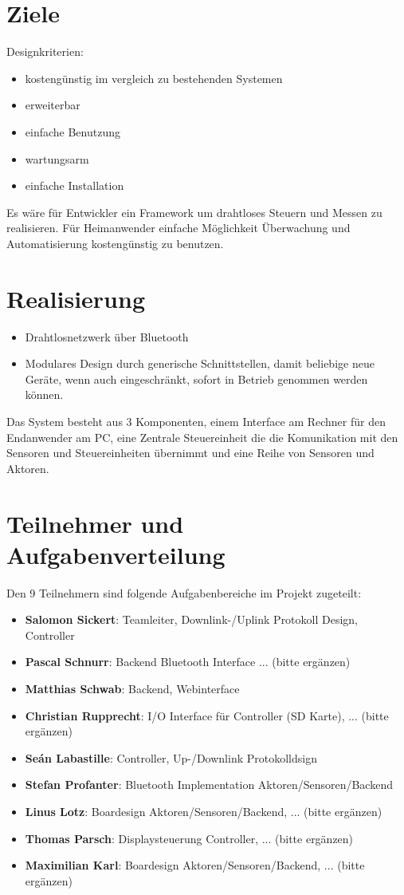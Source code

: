 \documentclass[12pt,a4paper]{article}
\begin{document}
\section{Ziele}
Designkriterien:
\begin{itemize}
	\item kostengünstig im vergleich zu bestehenden Systemen
	\item erweiterbar
	\item einfache Benutzung
	\item wartungsarm
	\item einfache Installation
\end{itemize}
Es wäre für Entwickler ein Framework um drahtloses Steuern und Messen zu realisieren. Für Heimanwender einfache Möglichkeit Überwachung und Automatisierung kostengünstig zu benutzen. 

\section{Realisierung}
\begin{itemize}
	\item Drahtlosnetzwerk über Bluetooth
	\item Modulares Design durch generische Schnittstellen, damit beliebige neue Geräte, wenn auch eingeschränkt, sofort in Betrieb genommen werden können.
\end{itemize}
Das System besteht aus 3 Komponenten, einem Interface am Rechner für den Endanwender am PC, eine Zentrale Steuereinheit die die Komunikation mit den Sensoren und Steuereinheiten übernimmt und eine Reihe von Sensoren und Aktoren.

\section{Teilnehmer und Aufgabenverteilung}

Den 9 Teilnehmern sind folgende Aufgabenbereiche im Projekt zugeteilt:\\

\begin{itemize}
	\item {\bf Salomon Sickert}: Teamleiter, Downlink-/Uplink Protokoll Design, Controller
	\item {\bf Pascal Schnurr}: Backend Bluetooth Interface ... (bitte ergänzen)
	\item {\bf Matthias Schwab}: Backend, Webinterface
	\item {\bf Christian Rupprecht}: I/O Interface für Controller (SD Karte), ... (bitte ergänzen)
	\item {\bf Seán Labastille}: Controller, Up-/Downlink Protokolldsign
	\item {\bf Stefan Profanter}: Bluetooth Implementation Aktoren/Sensoren/Backend
	\item {\bf Linus Lotz}: Boardesign Aktoren/Sensoren/Backend, ... (bitte ergänzen)
	\item {\bf Thomas Parsch}: Displaysteuerung Controller, ... (bitte ergänzen)
	\item {\bf Maximilian Karl}: Boardesign Aktoren/Sensoren/Backend, ... (bitte ergänzen)
\end{itemize}
\end{document}
